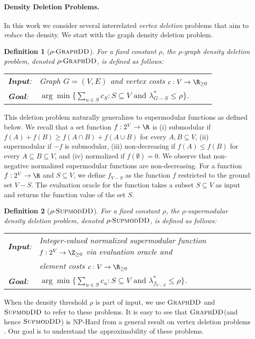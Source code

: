 \documentclass{article}
\newtheorem{definition}{Definition}[section]
\newcommand{\dds}{\ensuremath{\textsc{GraphDD}}\xspace}
\newcommand{\rhodds}[1]{\ensuremath{#1\text{-}\dds}\xspace}
\newcommand{\sdds}{\ensuremath{\textsc{SupmodDD}}\xspace}
\newcommand{\rhosdds}[1]{\ensuremath{#1\text{-}\sdds}}
\begin{document}
\paragraph{Density Deletion Problems.} In this work we consider several interrelated \emph{vertex deletion} problems that aim to \emph{reduce} the density. 
We start with the graph density deletion problem. \begin{definition}[\rhodds{\rho}] For a fixed constant $\rho$, the $\rho$-graph density deletion problem, denoted \rhodds{\rho}, is defined as follows:
\begin{mdframed}
\begin{tabular}{ l l }
 \emph{\textbf{Input}:} &  Graph $G=(V, E)$ and vertex costs $c:V\rightarrow\R_{\ge 0}$ \vspace{1mm}\\  
 \emph{\textbf{Goal}:} & $\arg \min\{\sum_{u\in S}c_S : S\subseteq V \text{ and } \lambda^*_{G-S} \le \rho\}$. 
\end{tabular}
\end{mdframed}
\end{definition}
This deletion problem naturally generalizes to supermodular functions as defined below. We recall that a set function $f: 2^V\rightarrow \R$ is (i) submodular if $f(A)+f(B)\ge f(A\cap B) + f(A\cup B)$ for every $A, B\subseteq V$, (ii) supermodular if $-f$ is submodular, (iii) non-decreasing if $f(A)\le f(B)$ for every $A\subseteq B\subseteq V$, and (iv) normalized if $f(\emptyset)=0$. We observe that non-negative normalized supermodular functions are non-decreasing. For a function $f: 2^V\rightarrow \R$ and $S\subseteq V$, we define $f_{V-S}$ as the function $f$ restricted to the ground set $V-S$. The evaluation oracle for the function takes a subset $S\subseteq V$ as input and returns the function value of the set $S$. \begin{definition}[\rhosdds{\rho}] For a fixed constant $\rho$, the $\rho$-supermodular density deletion problem, denoted \rhosdds{\rho}, is defined as follows:
    \begin{mdframed}
\begin{tabular}{ l l }
 \emph{\textbf{Input}:} &  Integer-valued normalized supermodular function $f:2^V\rightarrow\Z_{\ge 0}$ via evaluation oracle and \\
 & element costs $c:V\rightarrow\R_{\ge 0}$ \vspace{1mm}\\  
\emph{\textbf{Goal}:} & $\arg \min\{\sum_{u\in S}c_u : S\subseteq V \text{ and } \lambda^*_{f_{V-S}} \le \rho\}$. 
\end{tabular}
\end{mdframed}
\end{definition}
When the density threshold $\rho$ is part of input, we use \dds and \sdds to refer to these problems. It is easy to see that \dds (and hence \sdds) is NP-Hard from a general result on vertex deletion problems \cite{Lewis_Yannakakis_1980}. Our goal is to understand the approximability of these problems.
\end{document}
